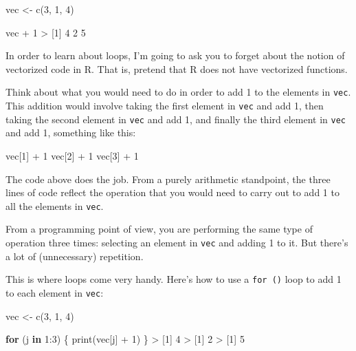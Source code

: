 \documentclass[
]{book}
\newenvironment{Shaded}{\begin{snugshade}}{\end{snugshade}}
\newcommand{\ControlFlowTok}[1]{\textcolor[rgb]{0.13,0.29,0.53}{\textbf{#1}}}
\newcommand{\DecValTok}[1]{\textcolor[rgb]{0.00,0.00,0.81}{#1}}
\newcommand{\FunctionTok}[1]{\textcolor[rgb]{0.00,0.00,0.00}{#1}}
\newcommand{\NormalTok}[1]{#1}
\newcommand{\OtherTok}[1]{\textcolor[rgb]{0.56,0.35,0.01}{#1}}
\newcommand{\SpecialCharTok}[1]{\textcolor[rgb]{0.00,0.00,0.00}{#1}}
\begin{document}
\begin{Shaded}
\begin{Highlighting}[]
\NormalTok{vec }\OtherTok{\textless{}{-}} \FunctionTok{c}\NormalTok{(}\DecValTok{3}\NormalTok{, }\DecValTok{1}\NormalTok{, }\DecValTok{4}\NormalTok{) }

\NormalTok{vec }\SpecialCharTok{+} \DecValTok{1}
\SpecialCharTok{\textgreater{}}\NormalTok{ [}\DecValTok{1}\NormalTok{] }\DecValTok{4} \DecValTok{2} \DecValTok{5}
\end{Highlighting}
\end{Shaded}

In order to learn about loops, I'm going to ask you to forget about the notion
of vectorized code in R. That is, pretend that R does not have vectorized functions.

Think about what you would need to do in order to add 1 to the elements
in \texttt{vec}. This addition would involve taking the first element in \texttt{vec} and
add 1, then taking the second element in \texttt{vec} and add 1, and finally the third
element in \texttt{vec} and add 1, something like this:

\begin{Shaded}
\begin{Highlighting}[]
\NormalTok{vec[}\DecValTok{1}\NormalTok{] }\SpecialCharTok{+} \DecValTok{1}
\NormalTok{vec[}\DecValTok{2}\NormalTok{] }\SpecialCharTok{+} \DecValTok{1}
\NormalTok{vec[}\DecValTok{3}\NormalTok{] }\SpecialCharTok{+} \DecValTok{1}
\end{Highlighting}
\end{Shaded}

The code above does the job. From a purely arithmetic standpoint, the three
lines of code reflect the operation that you would need to carry out to add
1 to all the elements in \texttt{vec}.

From a programming point of view, you are performing the same type of operation
three times: selecting an element in \texttt{vec} and adding 1 to it. But there's
a lot of (unnecessary) repetition.

This is where loops come very handy. Here's how to use a \texttt{for\ ()} loop
to add 1 to each element in \texttt{vec}:

\begin{Shaded}
\begin{Highlighting}[]
\NormalTok{vec }\OtherTok{\textless{}{-}} \FunctionTok{c}\NormalTok{(}\DecValTok{3}\NormalTok{, }\DecValTok{1}\NormalTok{, }\DecValTok{4}\NormalTok{)}

\ControlFlowTok{for}\NormalTok{ (j }\ControlFlowTok{in} \DecValTok{1}\SpecialCharTok{:}\DecValTok{3}\NormalTok{) \{}
  \FunctionTok{print}\NormalTok{(vec[j] }\SpecialCharTok{+} \DecValTok{1}\NormalTok{)}
\NormalTok{\}}
\SpecialCharTok{\textgreater{}}\NormalTok{ [}\DecValTok{1}\NormalTok{] }\DecValTok{4}
\SpecialCharTok{\textgreater{}}\NormalTok{ [}\DecValTok{1}\NormalTok{] }\DecValTok{2}
\SpecialCharTok{\textgreater{}}\NormalTok{ [}\DecValTok{1}\NormalTok{] }\DecValTok{5}
\end{Highlighting}
\end{Shaded}
\end{document}
